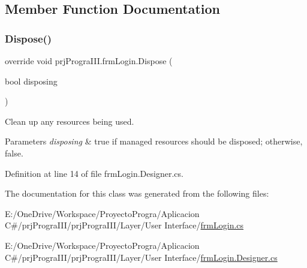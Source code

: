 \subsection{Member Function Documentation}
\hypertarget{classprj_progra_i_i_i_1_1frm_login_a27281d040dd63cb757745c28069700d7}{}\label{classprj_progra_i_i_i_1_1frm_login_a27281d040dd63cb757745c28069700d7} 
\subsubsection{\texorpdfstring{Dispose()}{Dispose()}}
{\footnotesize\ttfamily override void prj\+Progra\+I\+I\+I.\+frm\+Login.\+Dispose (\begin{DoxyParamCaption}\item[{bool}]{disposing }\end{DoxyParamCaption})\hspace{0.3cm}{\ttfamily [protected]}}



Clean up any resources being used. 


\begin{DoxyParams}{Parameters}
{\em disposing} & true if managed resources should be disposed; otherwise, false.\\
\hline
\end{DoxyParams}


Definition at line 14 of file frm\+Login.\+Designer.\+cs.



The documentation for this class was generated from the following files\+:\begin{DoxyCompactItemize}
\item 
E\+:/\+One\+Drive/\+Workspace/\+Proyecto\+Progra/\+Aplicacion C\#/prj\+Progra\+I\+I\+I/prj\+Progra\+I\+I\+I/\+Layer/\+User Interface/\hyperlink{frm_login_8cs}{frm\+Login.\+cs}\item 
E\+:/\+One\+Drive/\+Workspace/\+Proyecto\+Progra/\+Aplicacion C\#/prj\+Progra\+I\+I\+I/prj\+Progra\+I\+I\+I/\+Layer/\+User Interface/\hyperlink{frm_login_8_designer_8cs}{frm\+Login.\+Designer.\+cs}\end{DoxyCompactItemize}
